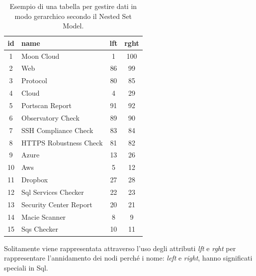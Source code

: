 \begin{table}[ht!]
\centering
\begin{tabular}[c]{| c | l | c | c |}
    \hline
    id & name & lft & rght \\ [0.5ex] 
    \hline
    \rowcolor{rootnodecell} 1 & Moon Cloud & 1 & 100 \\ [0.5ex] 
    \rowcolor{categorycell} 2 & Web & 86 & 99 \\ [0.5ex] 
    \rowcolor{categorycell} 3 & Protocol & 80 & 85 \\ [0.5ex] 
    \rowcolor{categorycell} 4 & Cloud & 4 & 29 \\ [0.5ex] 
    \rowcolor{evaluationcell} 5 & Portscan Report & 91 & 92 \\ [0.5ex] 
    \rowcolor{evaluationcell} 6 & Observatory Check & 89 & 90 \\ [0.5ex] 
    \rowcolor{evaluationcell} 7 & SSH Compliance Check & 83 & 84 \\ [0.5ex] 
    \rowcolor{evaluationcell} 8 & HTTPS Robustness Check & 81 & 82 \\ [0.5ex] 
    \rowcolor{categorycell} 9 & Azure & 13 & 26 \\ [0.5ex] 
    \rowcolor{categorycell} 10 & Aws & 5 & 12 \\ [0.5ex] 
    \rowcolor{categorycell} 11 & Dropbox & 27 & 28 \\ [0.5ex] 
    \rowcolor{evaluationcell} 12 & Sql Services Checker & 22 & 23 \\ [0.5ex] 
    \rowcolor{evaluationcell} 13 & Security Center Report & 20 & 21 \\ [0.5ex] 
    \rowcolor{evaluationcell} 14 & Macie Scanner & 8 & 9 \\ [0.5ex] 
    \rowcolor{evaluationcell} 15 & Sqs Checker & 10 & 11 \\ [0.5ex]
    \hline
\end{tabular}
\caption{Esempio di una tabella per gestire dati in modo gerarchico secondo il Nested Set Model.}
\label{table:nested_set_model_table}
\end{table}
\hfill\break
Solitamente viene rappresentata attraverso l'uso degli attributi \textit{lft} e \textit{rght} per rappresentare l'annidamento dei nodi 
perché i nome: \textit{left} e \textit{right}, hanno significati speciali in Sql.
%
\newpage
%
